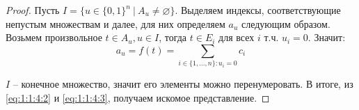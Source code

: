 \documentclass[../main.tex]{subfiles}
\begin{document}
\begin{proof}
	Пусть $I = \{u \in \{0, 1\}^n \ | \ A_u \neq \varnothing\}$. Выделяем индексы, соответствующие непустым множествам и далее, для них определяем $a_u$ следующим образом. Возьмем произвольное $t \in A_u, u \in I$, тогда $t \in E_i$ для всех $i$ т.ч. $u_i = 0$. Значит:
	\begin{equation}\label{eq:1:1:4:3}
		a_u = f(t) = \sum_{i \in \{1, ..., n\} : u_i = 0}{c_i}
	\end{equation}

	$I$ -- конечное множество, значит его элементы можно перенумеровать. В итоге, из \eqref{eq:1:1:4:2} и \eqref{eq:1:1:4:3}, получаем искомое представление.
	
\end{proof}
\end{document}
